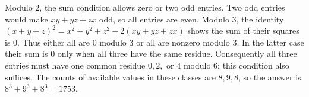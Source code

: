 Modulo $2$, the sum condition allows zero or two odd entries. Two odd entries would make $xy+yz+zx$ odd, so all entries are even. Modulo $3$, the identity $(x+y+z)^2=x^2+y^2+z^2+2(xy+yz+zx)$ shows the sum of their squares is $0$. Thus either all are $0$ modulo $3$ or all are nonzero modulo $3$. In the latter case their sum is $0$ only when all three have the same residue. Consequently all three entries must have one common residue $0,2,$ or $4$ modulo $6$; this condition also suffices. The counts of available values in these classes are $8,9,8$, so the answer is $8^3+9^3+8^3=\boxed{1753}$.
